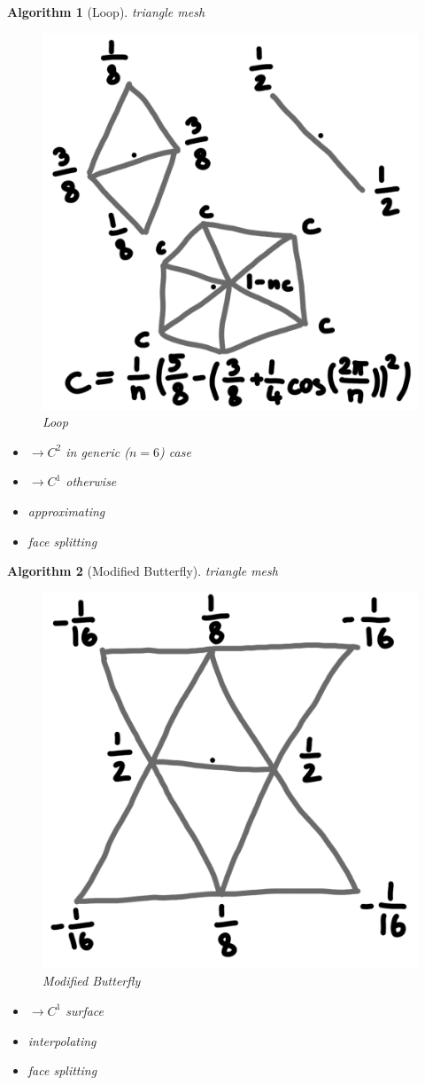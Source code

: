\documentclass[conference]{IEEEtran}
\newtheorem{algorithm}{Algorithm}
\begin{document}
\begin{algorithm}[Loop]
	triangle mesh
	
	\begin{figure}[h!]
		\centering
		\includegraphics[width=0.4\linewidth]{figures/loop_short}
		\caption{Loop}
	\end{figure}
	
	\begin{itemize}
		\item $\rightarrow C^2$ in generic ($n=6$) case
		\item $\rightarrow C^1$ otherwise
		\item approximating
		\item face splitting
	\end{itemize}
\end{algorithm}

\newpage
\begin{algorithm}[Modified Butterfly]
	triangle mesh
	
	\begin{figure}[h!]
		\centering
		\includegraphics[width=0.4\linewidth]{figures/modified_butterfly_short}
		\caption{Modified Butterfly}
	\end{figure}
	
	\begin{itemize}
		\item $\rightarrow C^1$ surface
		\item interpolating
		\item face splitting
	\end{itemize}
\end{algorithm}
\end{document}
